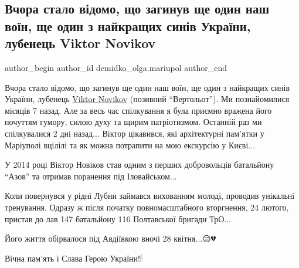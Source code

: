  
 
 
 
 

\subsection{Вчора стало відомо, що загинув ще один наш воїн, ще один з найкращих синів України, лубенець Viktor Novikov }
\label{sec:30_04_2023.fb.demidko_olga.mariupol.1.zagunyv_vojin_lubenec_viktor_novikov}

\ifcmt
 author_begin
   author_id demidko_olga.mariupol
 author_end
\fi

Вчора стало відомо, що загинув ще один наш воїн, ще один з найкращих синів
України, лубенець
\href{https://www.facebook.com/profile.php?id=100050036137720}{Viktor Novikov}
(позивний \enquote{Вертольот}). Ми познайомилися місяців 7 назад. Але за весь
час  спілкування я була приємно вражена його почуттям гумору, силою духу та
щирим патріотизмом. Останній раз ми спілкувалися 2 дні назад... Віктор
цікавився, які архітектурні пам'ятки у Маріуполі вцілілі та як можна потрапити
на мою екскурсію у Києві... 

У 2014 році Віктор Новіков став одним з перших добровольців батальйону
\enquote{Азов} та отримав поранення під Іловайськом... 

Коли повернувся у рідні Лубни займався вихованням молоді, проводив унікальні
тренування. Одразу ж після початку повномасштабного вторгнення, 24 лютого,
пристав до лав 147 батальйону 116 Полтавської бригади ТрО... 

Його життя обірвалося під Авдіївкою вночі 28 квітня...😔💔 

Вічна пам'ять і Слава Герою України!🕯🙏🇺🇦

